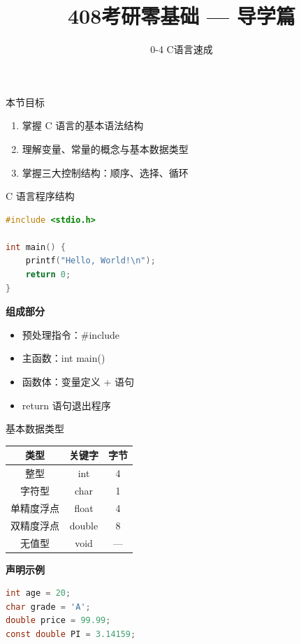 \documentclass[10pt, aspectratio=169]{beamer}
\title{408考研零基础 --- 导学篇}
\subtitle{0-4 C语言速成}
\author{}
\date{}
\begin{document}
\begin{frame}{本节目标}
    \begin{enumerate}
        \item 掌握 C 语言的基本语法结构
        \item 理解变量、常量的概念与基本数据类型
        \item 掌握三大控制结构：顺序、选择、循环
    \end{enumerate}
\end{frame}

\begin{frame}[fragile]{C 语言程序结构}
    \begin{lstlisting}[language=C, basicstyle=\ttfamily\small]
#include <stdio.h>

int main() {
    printf("Hello, World!\n");
    return 0;
}
    \end{lstlisting}
    \vspace{0.3em}
    \textbf{组成部分}
    \begin{itemize}
        \item 预处理指令：\#include
        \item 主函数：int main()
        \item 函数体：变量定义 + 语句
        \item return 语句退出程序
    \end{itemize}
\end{frame}

\begin{frame}[fragile]{基本数据类型}
    \begin{center}
    \begin{tabular}{|c|c|c|}
        \hline
        \textbf{类型} & \textbf{关键字} & \textbf{字节} \\ \hline
        整型 & int & 4 \\ \hline
        字符型 & char & 1 \\ \hline
        单精度浮点 & float & 4 \\ \hline
        双精度浮点 & double & 8 \\ \hline
        无值型 & void & --- \\ \hline
    \end{tabular}
    \end{center}
    \vspace{0.5em}
    \textbf{声明示例}
    \begin{lstlisting}[language=C, basicstyle=\ttfamily\small]
int age = 20;
char grade = 'A';
double price = 99.99;
const double PI = 3.14159;
    \end{lstlisting}
\end{frame}
\end{document}
